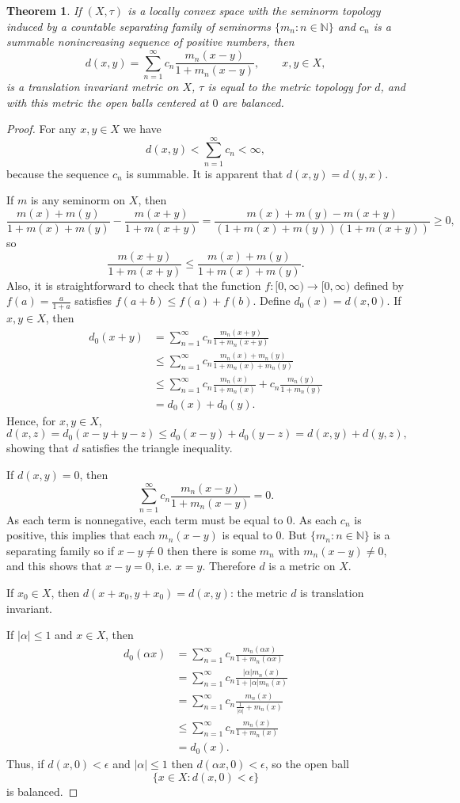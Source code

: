 \documentclass{article}
\newtheorem{theorem}{Theorem}
\begin{document}
\begin{theorem}
If $(X,\tau)$ is a locally convex space with the seminorm topology induced by a countable separating family of seminorms $\{m_n:n \in \mathbb{N}\}$
and $c_n$ is a summable nonincreasing sequence of positive numbers,
then 
\[
d(x,y) =\sum_{n=1}^\infty c_n \frac{m_n(x-y)}{1+m_n(x-y)}, \qquad x,y \in X,
\]
is a translation invariant metric on $X$, $\tau$ is equal to the metric topology for $d$, and with this metric the open balls centered at $0$  are balanced.
\label{metrizable}
\end{theorem}
\begin{proof}
For any $x,y \in X$ we have
\[
d(x,y) < \sum_{n=1}^\infty c_n < \infty,
\]
because the sequence $c_n$ is summable. It is apparent that $d(x,y)=d(y,x)$. 

If $m$ is any seminorm on $X$, then
\[
\frac{m(x)+m(y)}{1+m(x)+m(y)}-\frac{m(x+y)}{1+m(x+y)}=\frac{m(x)+m(y)-m(x+y)}{(1+m(x)+m(y))(1+m(x+y))} \geq 0,
\]
so
\[
\frac{m(x+y)}{1+m(x+y)} \leq \frac{m(x)+m(y)}{1+m(x)+m(y)}.
\]
Also, it is straightforward to check that the function $f:[0,\infty) \to [0,\infty)$ defined by $f(a)=\frac{a}{1+a}$ satisfies $f(a+b) \leq f(a)+f(b)$. 
Define $d_0(x)=d(x,0)$. If $x,y \in X$, then
\begin{align*}
d_0(x+y)&=\sum_{n=1}^\infty c_n \frac{m_n(x+y)}{1+m_n(x+y)}\\
&\leq \sum_{n=1}^\infty c_n \frac{m_n(x)+m_n(y)}{1+m_n(x)+m_n(y)}\\
&\leq \sum_{n=1}^\infty c_n \frac{m_n(x)}{1+m_n(x)} + c_n \frac{m_n(y)}{1+m_n(y)}\\
&=d_0(x)+d_0(y).
\end{align*}
Hence, for $x,y \in X$,
\[
d(x,z) = d_0(x-y+y-z) \leq d_0(x-y)+d_0(y-z) = d(x,y)+d(y,z),
\]
showing that $d$ satisfies the triangle inequality.

If $d(x,y)=0$, then 
\[
\sum_{n=1}^\infty c_n \frac{m_n(x-y)}{1+m_n(x-y)}=0.
\]
As each term is nonnegative, each term must be equal to $0$. As each $c_n$ is positive, this implies that each $m_n(x-y)$ is equal to $0$.
But $\{m_n: n \in \mathbb{N}\}$ is a separating family so if $x-y \neq 0$ then there is some $m_n$ with $m_n(x-y) \neq 0$, and this shows that
$x-y=0$, i.e. $x=y$. Therefore $d$ is a metric on $X$.

If $x_0 \in X$, then $d(x+x_0,y+x_0)=d(x,y)$: the metric $d$ is translation invariant.

If $|\alpha| \leq 1$ and $x \in X$, then
\begin{align*}
d_0(\alpha x)&=\sum_{n=1}^\infty c_n \frac{m_n(\alpha x)}{1+m_n(\alpha x)}\\
&=\sum_{n=1}^\infty c_n \frac{|\alpha| m_n(x)}{1+|\alpha| m_n(x)}\\
&=\sum_{n=1}^\infty c_n \frac{m_n(x)}{\frac{1}{|\alpha|} + m_n(x)}\\
&\leq \sum_{n=1}^\infty c_n \frac{m_n(x)}{1+m_n(x)}\\
&=d_0(x).
\end{align*}
Thus, if $d(x,0)<\epsilon$ and $|\alpha| \leq 1$ then $d(\alpha x,0)<\epsilon$, so the open ball
\[
\{x \in X: d(x,0)<\epsilon\}
\]
 is balanced.
 

\end{proof}
\end{document}
